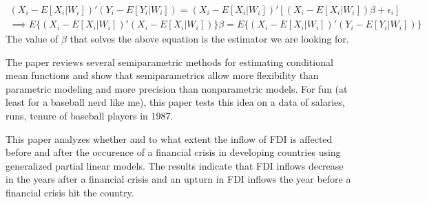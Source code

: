 \begin{gather*}
(X_i-E[X_i|W_i])'(Y_i-E[Y_i|W_i])=(X_i-E[X_i|W_i])'[(X_i-E[X_i|W_i])\beta+\epsilon_i]\\
\implies E\{(X_i-E[X_i|W_i])'(X_i-E[X_i|W_i])\}\beta=E\{(X_i-E[X_i|W_i])'(Y_i-E[Y_i|W_i])\}
\end{gather*}
The value of $\beta$ that solves the above equation is the estimator we are looking for. 
\begin{mdframed}[backgroundcolor=yellow!5] 
\begin{example} The paper reviews several semiparametric methods for estimating conditional mean functions and show that semiparametrics allow more flexibility than parametric modeling and more precision than nonparametric models. For fun (at least for a baseball nerd like me), this paper tests this idea on a data of salaries, runs, tenure of baseball players in 1987. 
\end{example}
\begin{example}[Ucal et al (2010)] This paper analyzes whether and to what extent the inflow of FDI is affected before and after the occurence of a financial crisis in developing countries using generalized partial linear models. The results indicate that FDI inflows decrease in the years after a financial crisis and an upturn in FDI inflows the year before a financial crisis hit the country.
\end{example}
\end{mdframed}


